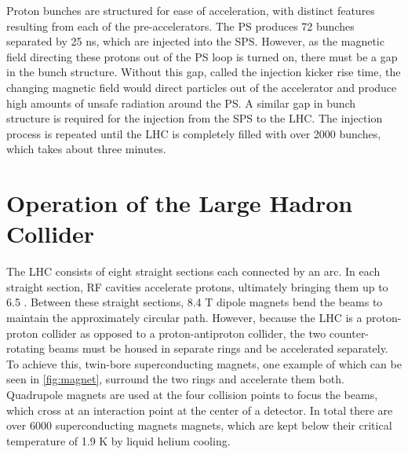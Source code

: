 Proton bunches are structured for ease of acceleration, with distinct features resulting from each of the pre-accelerators. The \ac{PS} produces 72 bunches separated by 25 ns, which are injected into the \ac{SPS}.%
However, as the magnetic field directing these protons out of the \ac{PS} loop is turned on, there must be a gap in the bunch structure. Without this gap, called the injection kicker rise time, the changing magnetic field would direct particles out of the accelerator and produce high amounts of unsafe radiation around the \ac{PS}. A similar gap in bunch structure is required for the injection from the \ac{SPS} to the \ac{LHC}. The injection process is repeated until the \ac{LHC} is completely filled with over 2000 bunches, which takes about three minutes.


\section{Operation of the Large Hadron Collider}

The \ac{LHC} consists of eight straight sections each connected by an arc. In each straight section, \ac{RF} cavities accelerate protons, ultimately bringing them up to 6.5 \gev. Between these straight sections, 8.4 T dipole magnets bend the beams to maintain the approximately circular path. However, because the \ac{LHC} is a proton-proton collider as opposed to a proton-antiproton collider, the two counter-rotating beams must be housed in separate rings and be accelerated separately. To achieve this, twin-bore superconducting magnets, one example of which can be seen in \autoref{fig:magnet}, surround the two rings and accelerate them both. Quadrupole magnets are used at the four collision points to focus the beams, which cross at an interaction point at the center of a detector. In total there are over 6000 superconducting magnets magnets, which are kept below their critical temperature of 1.9 K by liquid helium cooling. 


